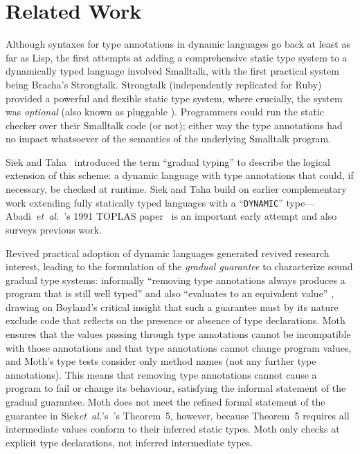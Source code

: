 
\section{Related Work}
\label{sec:related-work}

Although syntaxes for type annotations in dynamic languages go back at
least as far as Lisp\citep{cltl2}, the first attempts at adding a
comprehensive static type system to a dynamically typed
language involved 
Smalltalk\citep{RalphJohnson1986}, with the first practical system
being Bracha's Strongtalk\citep{strongtalk}. Strongtalk
(independently replicated for Ruby\citep{DBRuby09}) provided a
powerful and flexible static type system, where crucially, the system
was \emph{optional} (also known as pluggable
\cite{GiladPluggable2004}). Programmers could run the static checker
over their Smalltalk code (or not); either way the type annotations
had no impact whatsoever of the semantics of the underlying Smalltalk
program.

Siek and Taha~\cite{Siek2006} introduced the term ``gradual typing''
 to describe the logical extension of this scheme: a
dynamic language with type annotations that could, if necessary, be
checked at runtime. Siek and Taha build on earlier complementary work extending fully statically typed languages with a ``\texttt{DYNAMIC}''
type---Abadi~\textit{et~al.}~'s 1991 TOPLAS paper~\cite{AbadiTOPLAS1991} is an
important early attempt
and also surveys previous work.

Revived practical adoption of dynamic languages generated revived
research interest, leading to the formulation of the \textit{gradual
  guarantee} to characterize sound gradual type systems: informally
``removing type annotations always produces a program that is still
well typed'' and also ``evaluates to an equivalent value'' \citep{XXXSiek2015},
drawing on Boyland's critical insight
that such a guarantee must by its nature exclude code that
reflects on the presence or absence of type declarations\citep{Boyland2014}.
%
%
Moth ensures that the values passing through type annotations cannot
be incompatible with those annotations and that type annotations cannot change
program values, and Moth's type tests consider only method names (not any
further type annotations).  This means that removing type annotations
cannot cause a program to fail or change its behaviour, satisfying
the informal statement of the gradual guarantee.
%
Moth does not meet the refined formal statement of the guarantee in
Siek\textit{et~al.}'s~\cite{XXXSiek2015}'s Theorem~5, however, because
Theorem~5 requires
all intermediate values conform to their inferred static types.  Moth only
checks at explicit type declarations, not inferred intermediate types.

